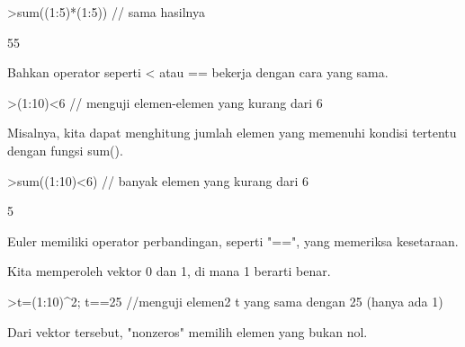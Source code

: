 \documentclass[a4paper,10pt]{article}
\begin{document}
\begin{eulernotebook}
\begin{eulercomment}
\begin{eulercomment}
\begin{eulercomment}
\begin{eulercomment}
\begin{eulercomment}
\begin{eulercomment}
\begin{eulerprompt}
>sum((1:5)*(1:5)) // sama hasilnya
\end{eulerprompt}
\begin{euleroutput}
  55
\end{euleroutput}
\begin{eulercomment}
Bahkan operator seperti \textless{} atau == bekerja dengan cara yang sama.
\end{eulercomment}
\begin{eulerprompt}
>(1:10)<6 // menguji elemen-elemen yang kurang dari 6
\end{eulerprompt}
\begin{euleroutput}
  [1,  1,  1,  1,  1,  0,  0,  0,  0,  0]
\end{euleroutput}
\begin{eulercomment}
Misalnya, kita dapat menghitung jumlah elemen yang memenuhi kondisi
tertentu dengan fungsi sum().
\end{eulercomment}
\begin{eulerprompt}
>sum((1:10)<6) // banyak elemen yang kurang dari 6
\end{eulerprompt}
\begin{euleroutput}
  5
\end{euleroutput}
\begin{eulercomment}
Euler memiliki operator perbandingan, seperti "==", yang memeriksa
kesetaraan.

Kita memperoleh vektor 0 dan 1, di mana 1 berarti benar.
\end{eulercomment}
\begin{eulerprompt}
>t=(1:10)^2; t==25 //menguji elemen2 t yang sama dengan 25 (hanya ada 1)
\end{eulerprompt}
\begin{euleroutput}
  [0,  0,  0,  0,  1,  0,  0,  0,  0,  0]
\end{euleroutput}
\begin{eulercomment}
Dari vektor tersebut, "nonzeros" memilih elemen yang bukan nol.


\end{eulercomment}
\end{eulercomment}
\end{eulercomment}
\end{eulercomment}
\end{eulercomment}
\end{eulercomment}
\end{eulercomment}
\end{eulernotebook}
\end{document}
